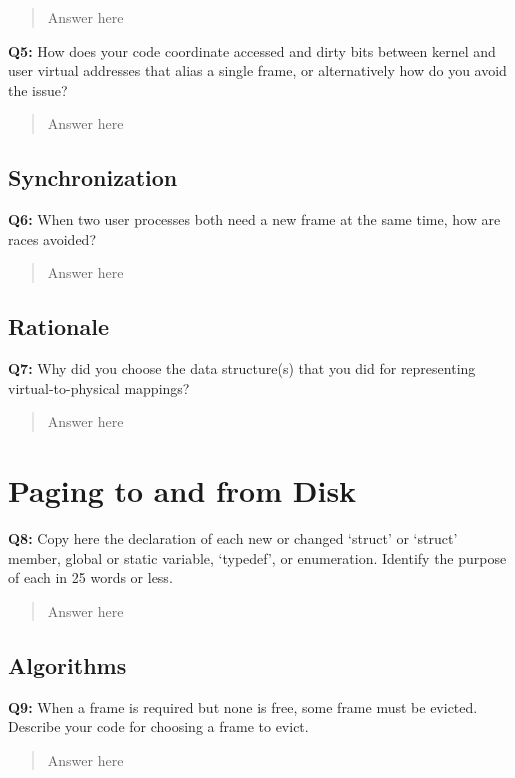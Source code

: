 \documentclass[a4paper,11pt]{paper}
\begin{document}
\begin{quote}
  Answer here
\end{quote}

\textbf{Q5:} How does your code coordinate accessed and dirty bits between kernel and user virtual addresses that alias a single frame, or alternatively how do you avoid the issue?
\begin{quote}
  Answer here
\end{quote}

\subsection{Synchronization}

\textbf{Q6:} When two user processes both need a new frame at the same time, how are races avoided?

\begin{quote}
  Answer here
\end{quote}

\subsection{Rationale}
\textbf{Q7:} Why did you choose the data structure(s) that you did for representing virtual-to-physical mappings?

\begin{quote}
  Answer here
\end{quote}


\section{Paging to and from Disk}

\textbf{Q8:} Copy here the declaration of each new or changed `struct' or `struct' member, global or static variable, `typedef', or enumeration.  Identify the purpose of each in 25 words or less.
\begin{quote}
  Answer here
\end{quote}

\pagebreak

\subsection{Algorithms}

\textbf{Q9:} When a frame is required but none is free, some frame must be evicted.  Describe your code for choosing a frame to evict.
\begin{quote}
  Answer here
\end{quote}
\end{document}
